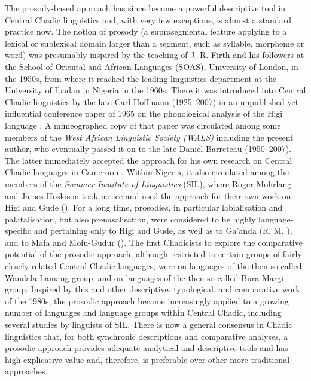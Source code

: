 \documentclass[output=paper]{langscibook}
\begin{document}
The prosody-based approach has since become a powerful descriptive tool in Central Chadic linguistics and, with very few exceptions, is almost a standard practice now. The notion of prosody (a suprasegmental feature applying to a lexical or sublexical domain larger than a segment, such as syllable, morpheme or word) was presumably inspired by the teaching of J. R. Firth and his followers at the School of Oriental and African Languages (SOAS), University of London, in the 1950s, from where it reached the leading linguistics department at the University of Ibadan in Nigeria in the 1960s. There it was introduced into Central Chadic linguistics by the late Carl Hoffmann (1925–2007) in an unpublished yet influential conference paper of 1965 on the phonological analysis of the Higi language \citep{Hoffmann1965}. A mimeographed copy of that paper was circulated among some members of the \textit{West African Linguistic Society (WALS)} including the present author, who eventually passed it on to the late Daniel Barreteau (1950–2007). The latter immediately accepted the approach for his own research on Central Chadic languages in Cameroon \citep{Barreteau1983}. Within Nigeria, it also circulated among the members of the \textit{Summer Institute of Linguistics} (SIL), where Roger Mohrlang and James Hoskison took notice and used the approach for their own work on Higi \citep{Mohrlang1971, Mohrlang1972} and Gude (\citealt{Hoskison1974, Hoskison1975a, Hoskison1975b, Hoskison1983}). For a long time, prosodies, in particular labialisation and palatalisation, but also prenasalisation, were considered to be highly language-specific and pertaining only to Higi and Gude, as well as to Ga’anda (R. M. \citealt{Newman1977Y}), and to Mafa and Mofu-Gudur (\citealt{Barreteau1987}). The first Chadicists to explore the comparative potential of the prosodic approach, although restricted to certain groups of fairly closely related Central Chadic languages, were \citealt{Wolff1981, Wolff1983a, WolffEtAl1981} on languages of the then so-called Wandala-Lamang group, and \citet{Hoffmann1987} on languages of the then so-called Bura-Margi group. Inspired by this and other descriptive, typological, and comparative work of the 1980s, the prosodic approach became increasingly applied to a growing number of languages and language groups within Central Chadic, including several studies by linguists of SIL. There is now a general consensus in Chadic linguistics that, for both synchronic descriptions and comparative analyses, a prosodic approach provides adequate analytical and descriptive tools and has high explicative value and, therefore, is preferable over other more traditional approaches. 
\end{document}
